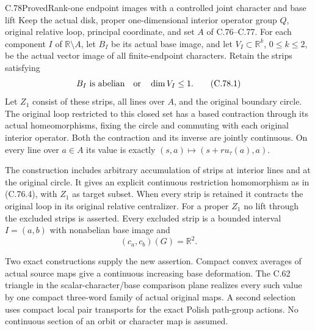 \begin{claim}{C.78}{Proved}{Rank-one endpoint images with a controlled joint character and base lift}
Keep the actual disk, proper one-dimensional interior
operator group $Q$, original relative loop, principal
coordinate, and set $A$ of C.76--C.77. For each
component $I$ of $\mathbb R\setminus A$, let $B_I$
be its actual base image, and let $V_I\subset\mathbb R^k$,
$0\leq k\leq2$, be the actual vector image of all
finite-endpoint characters. Retain the strips satisfying
\[
                  B_I\text{ is abelian}
                       \quad\hbox{or}\quad\dim V_I\leq1.
                                                               \tag{C.78.1}
\]
Let $Z_1$ consist of these strips, all lines over $A$,
and the original boundary circle. The original loop
restricted to this closed set has a based contraction
through its actual homeomorphisms, fixing the circle
and commuting with each original interior operator.
Both the contraction and its inverse are jointly
continuous. On every line over $a\in A$ its value
is exactly $(s,a)\mapsto(s+r u_\tau(a),a)$.

The construction includes arbitrary accumulation of
strips at interior lines and at the original circle.
It gives an explicit continuous restriction homomorphism
as in (C.76.4), with $Z_1$ as target subset. When
every strip is retained it contracts the original
loop in its original relative centralizer. For a
proper $Z_1$ no lift through the excluded strips is
asserted. Every excluded strip is a bounded interval
$I=(a,b)$ with nonabelian base image and
\[
                    (c_a,c_b)(G)=\mathbb R^2.
                                                               \tag{C.78.2}
\]

Two exact constructions supply the new assertion.
Compact convex averages of actual source maps give
a continuous increasing base deformation. The C.62
triangle in the scalar-character/base comparison plane
realizes every such value by one compact three-word
family of actual original maps. A second selection
uses compact local pair transports for the exact
Polish path-group actions. No continuous section of
an orbit or character map is assumed.
\end{claim}

